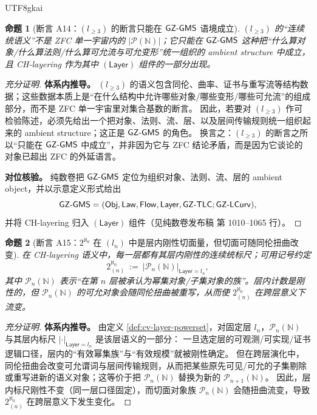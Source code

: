 \documentclass[12pt]{article}
\newtheorem{proposition}{命题}[section]
\begin{document}
\begin{CJK*}{UTF8}{gkai}
\begin{proposition}[断言 A14：$(l_{\ge3})$ 的断言只能在 $\mathsf{GZ\text{-}GMS}$ 语境成立]\label{prop:cv-A14}
$(l_{\ge3})$ 的“连续统语义”不是 ZFC 单一宇宙内的 $|\mathcal P(\mathbb N)|$；它只能在 $\mathsf{GZ\text{-}GMS}$ 这种把“什么算对象/什么算法则/什么算可允流与可允变形”统一组织的 ambient
  structure 中成立，且 CH-layering 作为其中 $(\mathsf{Layer})$ 组件的一部分出现。
\end{proposition}

\begin{proof}[充分证明]
\textbf{体系内推导。}
$(l_{\ge3})$ 的语义包含同伦、曲率、证书与重写流等结构数据；这些数据本质上是“在什么结构中允许哪些对象/哪些变形/哪些可允流”的组成部分，而不是 ZFC 单一宇宙里对集合基数的断言。
因此，若要对 $(l_{\ge3})$ 作可检验陈述，必须先给出一个把对象、法则、流、层、以及层间传输规则统一组织起来的 ambient structure；这正是 $\mathsf{GZ\text{-}GMS}$ 的角色。
换言之：$(l_{\ge3})$ 的断言之所以“只能在 $\mathsf{GZ\text{-}GMS}$ 中成立”，并非因为它与 ZFC 结论矛盾，而是因为它谈论的对象已超出 ZFC 的外延语言。

\textbf{对位核验。}
纯数卷把 $\mathsf{GZ\text{-}GMS}$ 定位为组织对象、法则、流、层的 ambient object，并以示意定义形式给出
\[
  \mathsf{GZ\text{-}GMS}=(\mathsf{Obj},\mathsf{Law},\mathsf{Flow},\mathsf{Layer},\mathsf{GZ\text{-}TLC};\mathsf{GZ\text{-}LCurv}),
\]
并将 CH-layering 归入 $(\mathsf{Layer})$ 组件（见纯数卷发布稿\cite{GaoZheng2025GFramework} 第 1010--1065 行）。
\end{proof}

\begin{proposition}[断言 A15：$2^{\aleph_0}$ 在 $(l_n)$ 中是层内刚性切面量，但切面可随同伦扭曲改变]\label{prop:cv-A15}
在 CH-layering 语义中，每一层都有其\emph{层内刚性}的连续统标尺；可用记号约定
\[
  2^{\aleph_0}_{(n)}\ :=\ \bigl|\mathcal P_n(\mathbb N)\bigr|_{\mathsf{Layer}=l_n},
\]
其中 $\mathcal P_n(\mathbb N)$ 表示“在第 $n$ 层被承认为幂集对象/子集对象的族”。层内计数是刚性的，但 $\mathcal P_n(\mathbb N)$ 的可允对象会随同伦扭曲被重写，从而使
  $2^{\aleph_0}_{(n)}$ 在跨层意义下流变。
\end{proposition}

\begin{proof}[充分证明]
\textbf{体系内推导。}
由定义 \ref{def:cv-layer-powerset}，对固定层 $l_n$，$\mathcal P_n(\mathbb N)$ 与其层内标尺 $|\cdot|_{\mathsf{Layer}=l_n}$ 是该层语义的一部分：
  一旦选定层的可观测/可实现/证书逻辑口径，层内的“有效幂集族”与“有效规模”就被刚性确定。
但在跨层演化中，同伦扭曲会改变可允谓词与层间传输规则，从而把某些原先可见/可允的子集剔除或重写进新的语义对象；这等价于把 $\mathcal P_n(\mathbb N)$ 替换为新的 $\mathcal P_{n+1}(\mathbb N)
  $。
因此，层内标尺刚性不变（同一层口径固定），而切面对象族 $\mathcal P_n(\mathbb N)$ 会随扭曲流变，导致 $2^{\aleph_0}_{(n)}$ 在跨层意义下发生变化。


\end{proof}
\end{CJK*}
\end{document}
